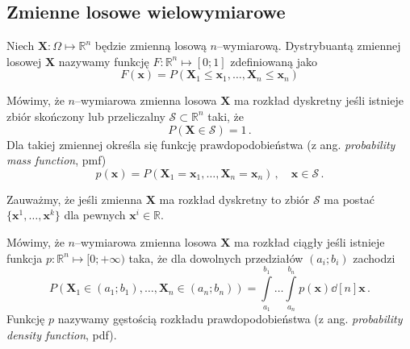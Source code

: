 \documentclass{myclass}
\numberwithin{equation}{section}
\begin{document}
\subsection{Zmienne losowe wielowymiarowe}

\begin{definition}
Niech \(\mathbf{X}: \Omega \mapsto \mathbb{R}^n\) będzie zmienną losową \(n\)--wymiarową.
Dystrybuantą zmiennej losowej \(\mathbf{X}\) nazywamy funkcję \(F: \mathbb{R}^n \mapsto [0;1]\)
zdefiniowaną jako
\begin{equation*}
    F(\mathbf{x}) = P(\mathbf{X}_1 \leq \mathbf{x}_1, \ldots, \mathbf{X}_n \leq \mathbf{x}_n)
\end{equation*}
\end{definition}

\begin{definition}
Mówimy, że \(n\)--wymiarowa zmienna losowa \(\mathbf{X}\) ma rozkład dyskretny jeśli istnieje zbiór
skończony lub przeliczalny \(\mathcal{S} \subset \mathbb{R}^n\) taki, że
\begin{equation*}
    P(\mathbf{X} \in \mathcal{S}) = 1\,.
\end{equation*}
Dla takiej zmiennej określa się funkcję prawdopodobieństwa (z ang. \textit{probability mass
function}, pmf)
\begin{equation*}
    p(\mathbf{x}) = P(\mathbf{X}_1 = \mathbf{x}_1, \ldots, \mathbf{X}_n = \mathbf{x}_n)\,,\quad \mathbf{x} \in \mathcal{S}\,.
\end{equation*}
\end{definition}

Zauważmy, że jeśli zmienna \(\mathbf{X}\) ma rozkład dyskretny to zbiór \(\mathcal{S}\) ma postać
\(\{\mathbf{x}^1,\ldots,\mathbf{x}^k\}\) dla pewnych \(\mathbf{x}^i \in \mathbb{R}\).

\begin{definition}
Mówimy, że \(n\)--wymiarowa zmienna losowa \(\mathbf{X}\) ma rozkład ciągły jeśli istnieje funkcja
\(p: \mathbb{R}^n \mapsto [0;+\infty)\) taka, że dla dowolnych przedziałów \((a_i;b_i)\) zachodzi
\begin{equation*}
    P(\mathbf{X}_1 \in (a_1;b_1), \ldots, \mathbf{X}_n \in (a_n;b_n)) = \int\limits_{a_1}^{b_1}\ldots\int\limits_{a_n}^{b_n}p(\mathbf{x}) \dd[n]{\mathbf{x}}\,.
\end{equation*}
Funkcję \(p\) nazywamy gęstością rozkładu prawdopodobieństwa (z ang. \textit{probability density
function}, pdf).
\end{definition}
\end{document}
